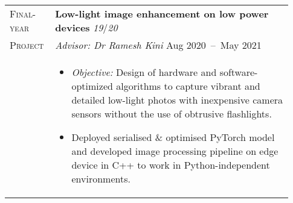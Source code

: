 \documentclass[letterpaper, 10pt, oneside]{article}
\newcommand{\stitle}[1]{\normalsize{\textsc{#1}}}
\newcommand{\bdit}[1]{{\textbf{#1}}}
\begin{document}
\begin{longtable}{@{} p{0.13\linewidth} p{0.8\linewidth}}
    \stitle{Final-year}  & \bdit{Low-light image enhancement on low power devices} \hfill \textsl{19}/\textsl{20}                                                                                                                            \\
    \stitle{Project}     & \textsl{Advisor: Dr Ramesh Kini} \hfill {Aug 2020\ --\ May 2021}                                                                                                                                                  \\
                         & \parbox{0.8\textwidth}{                                                                                                                                                                                           %
        \begin{itemize}[leftmargin=*, itemsep=-0.70ex, topsep=-0.88ex]
            \item \textsl{Objective:} Design of hardware and software-optimized algorithms to capture vibrant and detailed low-light photos with inexpensive camera sensors without the use of obtrusive flashlights.
            \item Deployed serialised \& optimised PyTorch model and developed image processing pipeline on edge device in C++ to work in Python-independent environments.
        \end{itemize}
    }
    \\
    \\





\end{longtable}
\end{document}
